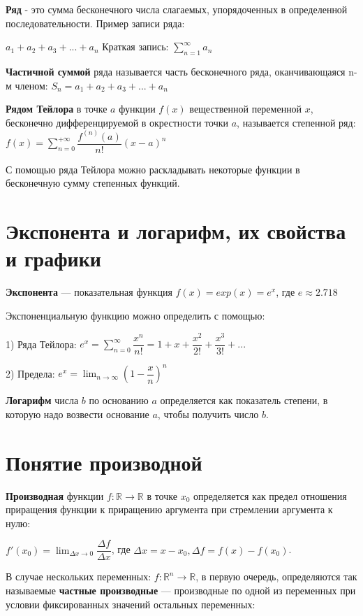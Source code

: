\documentclass[a4paper,14pt,fleqn]{article}
\begin{document}
\textbf{Ряд} - это сумма бесконечного числа слагаемых, упорядоченных в определенной последовательности. Пример записи ряда:

$a_1+a_2+a_3+...+a_n$  Краткая запись: $\sum_{n=1}^\infty a_n$

\textbf{Частичной суммой} ряда называется часть бесконечного ряда, оканчивающаяся n-м членом:
$S_n=a_1+a_2+a_3+...+a_n$

\textbf{Рядом Тейлора} в точке $a$ функции $f(x)$ вещественной переменной $x$, бесконечно дифференцируемой в окрестности точки $a$, называется степенной ряд:
$f(x)=\sum_{n=0}^{+\infty}\dfrac{f^{(n)}(a)}{n!}(x-a)^n$

С помощью ряда Тейлора можно раскладывать некоторые функции в бесконечную сумму степенных функций.

\section{Экспонента и логарифм, их свойства и графики}

\textbf{Экспонента} --- показательная функция
$f(x)=exp(x)=e^x$, где $e\approx2.718$

\noindent Экспоненциальную функцию можно определить с помощью:

1) Ряда Тейлора: $e^x=\sum_{n=0}^{\infty}\dfrac{x^n}{n!}=1+x+\dfrac{x^2}{2!}+\dfrac{x^3}{3!}+...$

2) Предела: $e^x=\lim_{n\to\infty}(1-\dfrac{x}{n})^n$

\textbf{Логарифм} числа $b$ по основанию $a$ определяется как показатель степени, в которую надо возвести основание $a$, чтобы получить число $b$.

\section{Понятие производной}

\textbf{Производная} функции $f:\mathbb{R}\to\mathbb{R}$ в точке $x_0$ определяется как предел отношения приращения функции к приращению аргумента при стремлении аргумента к нулю:

$f'(x_0)=\lim_{\Delta x\to0}\dfrac{\Delta f}{\Delta x}$, где $\Delta x=x-x_0, \Delta f=f(x)-f(x_0)$.

В случае нескольких переменных: $f:\mathbb{R}^n\to\mathbb{R}$, в первую очередь, определяются так называемые \textbf{частные производные} --- производные по одной из переменных при условии фиксированных значений остальных переменных:
\end{document}
